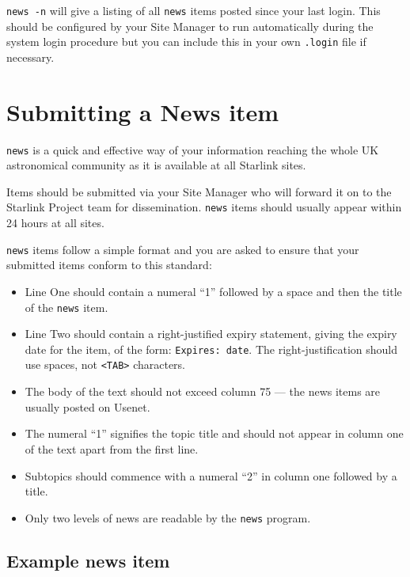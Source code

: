 {\tt news -n} will give a listing of all {\tt news} items posted since
your last login.  This should be configured by your Site Manager to run
automatically during the system login procedure but you can include
this in your own {\tt .login} file if necessary.

\section{Submitting a News item}

{\tt news} is a quick and effective way of your information reaching
the whole UK astronomical community as it is available at all Starlink
sites.

Items should be submitted via your Site Manager who will forward it on
to the Starlink Project team for dissemination. {\tt news} items should
usually appear within 24 hours at all sites.

{\tt news} items follow a simple format and you are asked to ensure that
your submitted items conform to this standard:

\begin{itemize}

\item Line One should contain a numeral ``1'' followed by a space and then
the title of the {\tt news} item.

\item Line Two should contain a right-justified expiry statement,
giving the expiry date for the item, of the form: {\tt Expires: date}.
The right-justification should use spaces, not {\tt <TAB>} characters.

\item The body of the text should not exceed column 75 ---
the news items are usually posted on Usenet.

\item The numeral ``1'' signifies the topic title and should not appear
in column one of the text apart from the first line.

\item Subtopics should commence with a numeral ``2'' in column one followed
by a title. 

\item Only two levels of news are readable by the {\tt news} program.

\end{itemize}

\subsection{Example news item}


